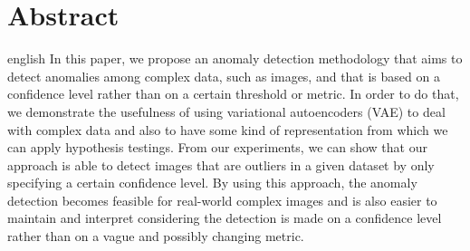 \chapter*{Abstract}             %
\label{chap:abstract}           %

\begin{otherlanguage*}{english}
In this paper, we propose an anomaly detection methodology that aims to detect anomalies among complex data, such as images, and that is based on a confidence level rather than on a certain threshold or metric. In order to do that, we demonstrate the usefulness of using variational autoencoders (VAE) to deal with complex data and also to have some kind of representation from which we can apply hypothesis testings. From our experiments, we can show that our approach is able to detect images that are outliers in a given dataset by only specifying a certain confidence level. By using this approach, the anomaly detection becomes feasible for real-world complex images and is also easier to maintain and interpret considering the detection is made on a confidence level rather than on a vague and possibly changing metric.
\end{otherlanguage*}
